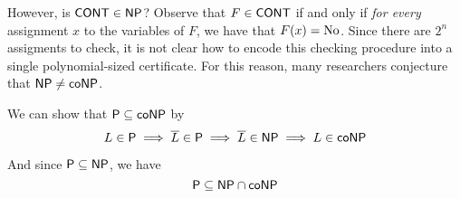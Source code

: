 However, is $\mathsf{CONT}\in\mathsf{NP}$? Observe that $F\in\mathsf{CONT}$ if and only if
\textit{for every} assignment $x$ to the variables of $F$, we have
that $F(x)=\text{No}$. Since there are $2^n$ assigments to check, it is not
clear how to encode this checking procedure into a single
polynomial-sized certificate. For this reason, many researchers
conjecture that $\mathsf{NP}\neq\mathsf{coNP}$.

\label{e6ea03d}

We can show that $\mathsf{P}\subseteq\mathsf{coNP}$ by
$$L\in\mathsf{P}\implies\overline L\in\mathsf{P}\implies\overline L\in\mathsf{NP}\implies L\in\mathsf{coNP}$$

And since $\mathsf{P}\subseteq\mathsf{NP}$, we have
$$\mathsf{P}\subseteq\mathsf{NP}\cap\mathsf{coNP}$$


